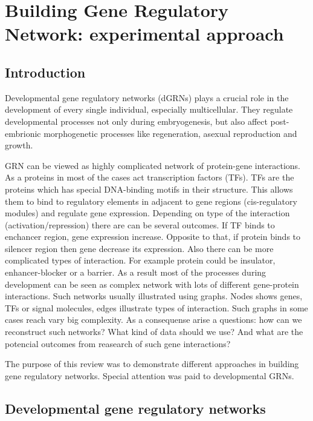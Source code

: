 \documentclass[a4paper, oneside]{report}
\begin{document}
	\setlength{\arrayrulewidth}{0.5mm}
	\setlength{\tabcolsep}{18pt}
	\renewcommand{\arraystretch}{1.5}
\chapter*{Building Gene Regulatory Network: experimental approach}
\section*{Introduction}

Developmental gene regulatory networks (dGRNs) plays a crucial role in the development of every single individual, especially multicellular. 
They regulate developmental processes not only during embryogenesis, but also affect post-embrionic morphogenetic processes like regeneration, asexual reproduction and growth.

GRN can be viewed as highly complicated network of protein-gene interactions. 
As a proteins in most of the cases act transcription factors (TFs). 
TFs are the proteins which has special DNA-binding motifs in their structure. 
This allows them to bind to regulatory elements in adjacent to gene regions (cis-regulatory modules) and regulate gene expression.
Depending on type of the interaction (activation/repression) there are can be several outcomes.
If TF binds to enchancer region, gene expression increase.
Opposite to that, if protein binds to silencer region then gene decrease its expression.
Also there can be more complicated types of interaction. 
For example protein could be insulator, enhancer-blocker or a barrier.
As a result most of the processes during development can be seen as complex network with lots of different gene-protein interactions.
Such networks usually illustrated using graphs.  
Nodes shows genes, TFs or signal molecules, edges illustrate types of interaction.
Such graphs in some cases reach vary big complexity.
As a consequense arise a questions: how can we reconstruct such networks? 
What kind of data should we use? 
And what are the potencial outcomes from reasearch of such gene interactions?

The purpose of this review was to demonstrate different approaches in building gene regulatory networks.
Special attention was paid to developmental GRNs.  

\section*{Developmental gene regulatory networks}
\end{document}
